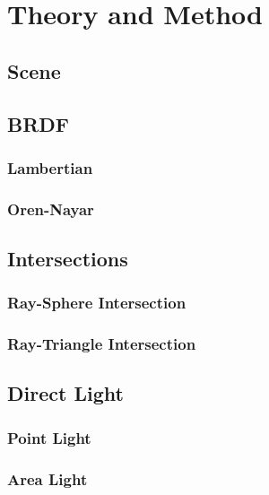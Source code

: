\documentclass[a4paper, twocolumn]{article}
\begin{document}
    \clearpage

    \section{Theory and Method} \label{sec:theory_and_method}

    \subsection{Scene} \label{sec:scene}
    
    \subsection{BRDF} \label{sec:brdf}
    \subsubsection{Lambertian} \label{sec:lambertian}
    \subsubsection{Oren-Nayar} \label{sec:oren-nayar}
    
    \subsection{Intersections} \label{sec:ray_intersection}
    \subsubsection{Ray-Sphere Intersection} \label{sec:ray_sphere_intersection}
    \subsubsection{Ray-Triangle Intersection} \label{sec:ray_triangle_intersection}

    \subsection{Direct Light} \label{sec:direct_light}
    \subsubsection{Point Light} \label{sec:point_light}
    \subsubsection{Area Light} \label{sec:area_light}
    
\end{document}

